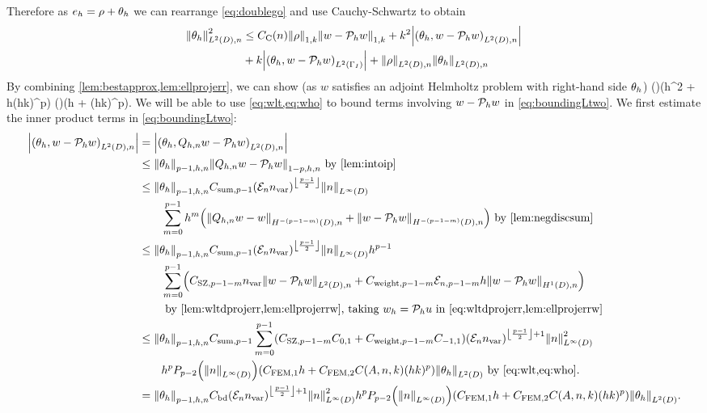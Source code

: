 Therefore as $e_{h} = \rho + \theta_{h}$ we can rearrange \cref{eq:doublego} and use Cauchy-Schwartz to obtain
\begin{align}
\NLtDn{\thetah}^2 &\leq \Cc \NW{\rho} \NW{w- \Ph w} + k^2 \abs{\IPLtDn{\thetah}{w- \Ph w}}\nonumber\\
&+ k \abs{\IPLtGI{\thetah}{w-\Ph w}} + \NLtDn{\rho}\NLtDn{\thetah}\label{eq:boundingLtwo}
\end{align}
By combining \cref{lem:bestapprox,lem:ellprojerr}, we can show (as $w$ satisfies an adjoint Helmholtz problem with right-hand side $\theta_{h}$)
\beq\label{eq:wlt}
 \leq {} \mleft(\mright)\mleft(\CFEMotilde h^2 + \CFEMttilde \CAnk h(hk)^p\mright)\NLtD{\thetah} \tand
\eeq
\beq\label{eq:who}
  \mleft(\mright)\mleft(\CFEMotilde h + \CFEMttilde \CAnk (hk)^p\mright)\NLtD{\thetah}.
\eeq
We will be able to use \cref{eq:wlt,eq:who} to bound terms involving $w - \mathcal P_{h} w$ in \cref{eq:boundingLtwo}. We first estimate the inner product terms in \cref{eq:boundingLtwo}:
\begin{align}
\abs{\IPLtDn{\thetah}{w- \Ph w}} &= \abs{\IPLtDn{\thetah}{\Qhn w - \Ph w}}\nonumber\\
&\leq \Nfn{p-1,h,n}{\thetah}\Nfn{1-p,h,n}{\Qhn w - \Ph w}\text{ by \cref{lem:intoip}}\nonumber\\
&\leq \Nfn{p-1,h,n}{\thetah} \Csumfn{p-1} \mleft(\En \nvar\mright)^{\floor{\frac{p-1}2}}\NLiD{n}\nonumber\\
&\quad\quad\sum_{m=0}^{p-1} h^{m}\mleft(\NHnfn{-(p-1-m)}{D}{\Qhn w - w}+ \NHnfn{-(p-1-m)}{D}{w - \Ph w}\mright) \text{ by \cref{lem:negdiscsum}}\nonumber\\
&\leq \Nfn{p-1,h,n}{\thetah} \Csumfn{p-1}\mleft(\En \nvar\mright)^{\floor{\frac{p-1}2}}\NLiD{n} h^{p-1}\nonumber\\
&\quad\quad\sum_{m=0}^{p-1} \mleft(\CSZfn{p-1-m}\nvar \NLtDn{w - \Ph w} + \Cwfn{p-1-m} \errn{p-1-m} h \NHoDn{w - \Ph w}\mright)\nonumber\\
&\quad\quad\text{ by \cref{lem:wltdprojerr,lem:ellprojerrw}, taking $\wh = \Ph u$ in \cref{eq:wltdprojerr,lem:ellprojerrw}}\nonumber\\
&\leq \Nfn{p-1,h,n}{\thetah} \Csumfn{p-1}\sum_{m=0}^{p-1} \mleft(\CSZfn{p-1-m}\Cfn{0,1} + \Cwfn{p-1-m} \Cfn{-1,1}\mright)                         \mleft(\En \nvar\mright)^{\floor{\frac{p-1}2}+1}\NLiD{n}^2 \nonumber\\
&\quad\quad h^p \Pfn{p-2}\mleft(\NLiD{n}\mright)\mleft(\CFEMotilde h + \CFEMttilde \CAnk (hk)^p\mright) \NLtD{\thetah} \text{ by \cref{eq:wlt,eq:who}}.\nonumber\\
&=\Nfn{p-1,h,n}{\thetah}  \Cfourteen \mleft(\En \nvar\mright)^{\floor{\frac{p-1}2}+1}\NLiD{n}^2 h^p \Pfn{p-2}\mleft(\NLiD{n}\mright)\mleft(\CFEMotilde h + \CFEMttilde \CAnk (hk)^p\mright) \NLtD{\thetah} \label{eq:innerprod1}.
\end{align}

